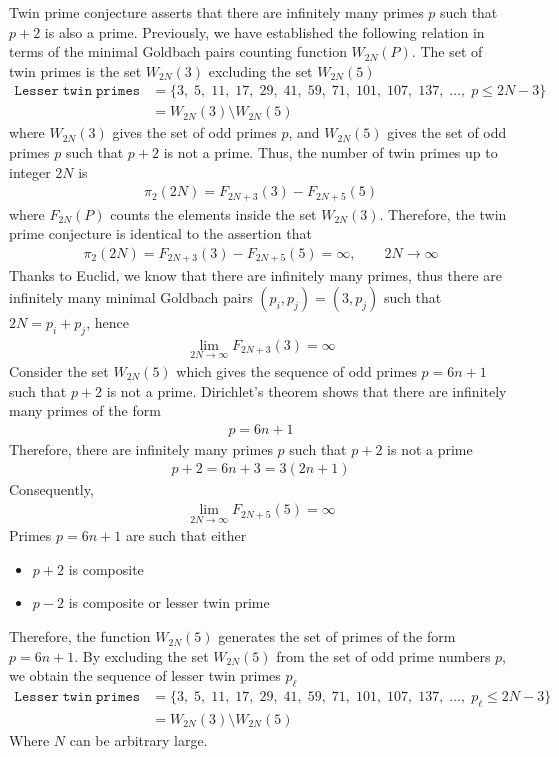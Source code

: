 ﻿Twin prime conjecture asserts that there are infinitely many primes $p$ such that $p+2$ is also a prime.
Previously, we have established the following relation in terms of the minimal Goldbach pairs counting function
$W_{2N}(P)$.
The set of twin primes is the set $W_{2N}(3)$ excluding the set $W_{2N}(5)$
\begin{align*}
    \mathtt{Lesser \; twin \; primes} &= \{ 3, \; 5, \; 11, \; 17, \; 29, \; 41, \; 59, \; 71, \; 101, \; 107, \; 137, \; \dots, \;  p \leq 2N - 3 \} \\
    &= W_{2N}(3) \setminus W_{2N}(5)
\end{align*}
where $W_{2N}(3)$ gives the set of odd primes $p$, and $W_{2N}(5)$ gives the set of odd primes $p$ such that $p+2$
is not a prime.
Thus, the number of twin primes up to integer $2N$ is
\begin{align*}
    \pi_2 (2N) = F_{2N+3}(3) - F_{2N+5}(5)
\end{align*}
where $F_{2N}(P)$ counts the elements inside the set $W_{2N}(3)$.
Therefore, the twin prime conjecture is identical to the assertion that
\begin{align*}
    \pi_2 (2N) = F_{2N+3}(3) - F_{2N+5}(5) = \infty, \quad \quad 2N\to\infty
\end{align*}
Thanks to Euclid, we know that there are infinitely many primes, thus
there are infinitely many minimal Goldbach pairs $(p_i, p_j) = (3, p_j)$ such that $2N=p_i+p_j$,
hence
\begin{align*}
    \lim_{2N\to\infty} F_{2N+3}(3) = \infty
\end{align*}
Consider the set $W_{2N}(5)$ which gives the sequence of odd primes $p=6n+1$ such that $p+2$ is not a prime.
Dirichlet's theorem shows that there are infinitely many primes of the form
\begin{align*}
    p = 6n+1
\end{align*}
Therefore, there are infinitely many primes $p$ such that $p+2$ is not a prime
\begin{align*}
    p+2 = 6n+3 = 3(2n+1)
\end{align*}
Consequently,
\begin{align*}
    \lim_{2N\to\infty} F_{2N+5}(5) = \infty
\end{align*}
Primes $p=6n+1$ are such that either
\begin{itemize}
    \item $p+2$ is composite
    \item $p-2$ is composite or lesser twin prime
\end{itemize}
Therefore, the function $W_{2N}(5)$ generates the set of primes of the form $p=6n+1$.
By excluding the set $W_{2N}(5)$ from the set of odd prime numbers $p$,
we obtain the sequence of lesser twin primes $p_{\ell}$
\begin{align*}
    \mathtt{Lesser \; twin \; primes} &= \{ 3, \; 5, \; 11, \; 17, \; 29, \; 41, \; 59, \; 71, \; 101, \; 107, \; 137, \; \dots, \;  p_{\ell} \leq 2N - 3 \} \\
    &= W_{2N}(3) \setminus W_{2N}(5)
\end{align*}
Where $N$ can be arbitrary large.
